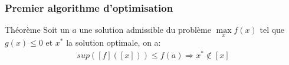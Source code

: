 \documentclass{beamer}
\begin{document}
\begin{frame}
    \frametitle{Premier algorithme d'optimisation}
    \begin{block}{Théorème}
        Soit un $a$ une solution admissible du problème $\max\limits_{x} f(x)$ tel que $g(x) \leq 0$ et $x^*$ la solution optimale, on a:
        \begin{align}
            sup([f]([x])) \leq f(a) \Rightarrow x^* \notin [x]
        \end{align}
    \end{block}




\end{frame}
\end{document}
